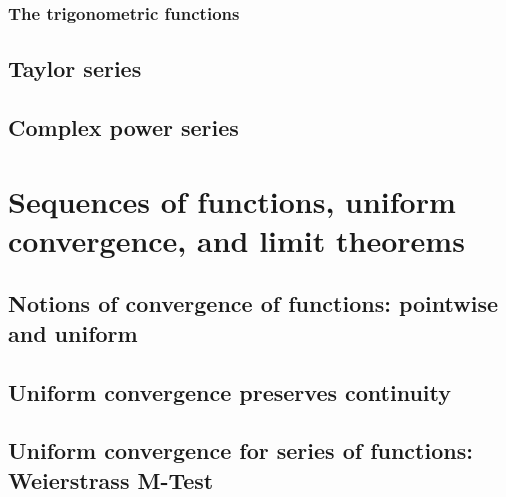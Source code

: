 \documentclass[10pt, a4paper]{article}
\begin{document}
\subsubsection{The trigonometric functions}

\subsection{Taylor series}

\subsection{Complex power series}

\newpage

\section{Sequences of functions, uniform convergence, and limit theorems}

\subsection{Notions of convergence of functions: pointwise and uniform}

\subsection{Uniform convergence preserves continuity}

\subsection{Uniform convergence for series of functions: Weierstrass M-Test}
\end{document}
